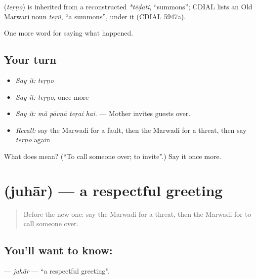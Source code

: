 \begin{cousinweb}
\textbf{} (\emph{teṛṇo}) is inherited from a reconstructed \emph{*tēḍati}, \textquotedblleft{}summons\textquotedblright{}; CDIAL lists an Old Marwari noun \emph{teṛū̃}, \textquotedblleft{}a summons\textquotedblright{}, under it (CDIAL 5947a).
\end{cousinweb}

\begin{grammarlens}[title={What you've built}]
One more word for saying what happened.
\end{grammarlens}

\subsection*{Your turn}
\begin{itemize}
\raggedright
  \item \emph{Say it:} \emph{teṛṇo}
  \item \emph{Say it:} \emph{teṛṇo}, once more
  \item \emph{Say it:} \emph{mā̃ pāvṇā teṛai hai.} — Mother invites guests over.
  \item \emph{Recall:} say the Marwadi for a fault, then the Marwadi for a threat, then say \emph{teṛṇo} again
\end{itemize}

\begin{tcolorbox}[breakable,colback=teal!4,colframe=teal!35!black,title={Before you move on}]
What does  mean? (\textquotedblleft{}To call someone over; to invite\textquotedblright{}.) Say it once more.
\end{tcolorbox}
\section[\texorpdfstring{\mw{जुहार} (juhār)}{जुहार (juhār)}]{ (juhār) — a respectful greeting}

\label{lesson:MW-C245-juhar}



\begin{quote}
Before the new one: say the Marwadi for a threat, then the Marwadi for to call someone over.
\end{quote}

\subsection*{You'll want to know: }
\textbf{} — \emph{juhār} — \textquotedblleft{}a respectful greeting\textquotedblright{}.

